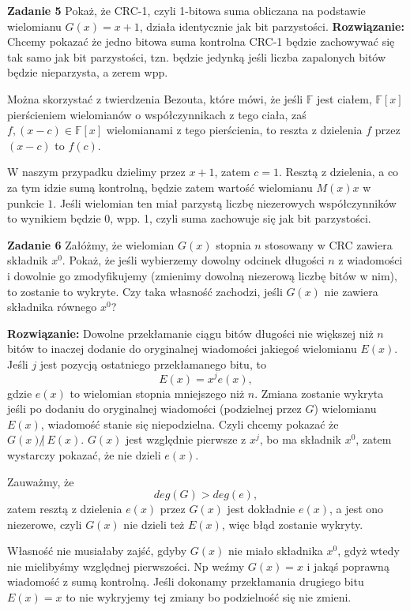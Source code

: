 \documentclass[12pt,a4paper]{article}
\begin{document}
\vskip10pt

\noindent
\textbf{Zadanie 5} Pokaż, że CRC-1, czyli 1-bitowa suma obliczana na podstawie wielomianu \(G(x) = x + 1\), działa identycznie jak bit parzystości.
\vskip5pt
\noindent
\textbf{Rozwiązanie:} Chcemy pokazać że jedno bitowa suma kontrolna CRC-1 będzie zachowywać się tak samo jak bit parzystości, tzn. będzie jedynką jeśli liczba zapalonych bitów będzie nieparzysta, a zerem wpp.

Można skorzystać z twierdzenia Bezouta, które mówi, że jeśli \(\mathbb{F}\) jest ciałem, \(\mathbb{F}{[x]}\) pierścieniem wielomianów o współczynnikach z tego ciała, zaś \(f,(x-c) \in \mathbb{F}[x]\) wielomianami z tego pierścienia, to reszta z dzielenia \(f\) przez \((x-c)\) to \(f(c)\).

W naszym przypadku dzielimy przez \(x+1\), zatem \(c = 1\). Resztą z dzielenia, a co za tym idzie sumą kontrolną, będzie zatem wartość wielomianu \(M(x)x\) w punkcie \(1\). Jeśli wielomian ten miał parzystą liczbę niezerowych współczynników to wynikiem będzie 0, wpp. 1, czyli suma zachowuje się jak bit parzystości.

\vskip10pt
\noindent
\textbf{Zadanie 6} Załóżmy, że wielomian \(G(x)\) stopnia \(n\) stosowany w CRC zawiera składnik \(x^0\). Pokaż, że jeśli wybierzemy dowolny odcinek długości \(n\) z wiadomości i dowolnie go zmodyfikujemy (zmienimy dowolną niezerową liczbę bitów w nim), to zostanie to wykryte. Czy taka własność zachodzi, jeśli \(G(x)\) nie zawiera składnika równego \(x^0\)?

\vskip5pt
\noindent
\textbf{Rozwiązanie:} Dowolne przekłamanie ciągu bitów długości nie większej niż \(n\) bitów to inaczej dodanie do oryginalnej wiadomości jakiegoś wielomianu \(E(x)\). Jeśli \(j\) jest pozycją ostatniego przekłamanego bitu, to
\[
	E(x) = x^je(x),
\]
gdzie \(e(x)\) to wielomian stopnia mniejszego niż \(n\). Zmiana zostanie wykryta jeśli po dodaniu do oryginalnej wiadomości (podzielnej przez \(G\)) wielomianu \(E(x)\), wiadomość stanie się niepodzielna. Czyli chcemy pokazać że \(G(x) \not|~ E(x)\). \(G(x)\) jest względnie pierwsze z \(x^j\), bo ma składnik \(x^0\), zatem wystarczy pokazać, że nie dzieli \(e(x)\).

Zauważmy, że 
\[
	deg(G) > deg(e),
\]
zatem resztą z dzielenia \(e(x)\) przez \(G(x)\) jest dokładnie \(e(x)\), a jest ono niezerowe, czyli \(G(x)\) nie dzieli też \(E(x)\), więc błąd zostanie wykryty. 

Własność nie musiałaby zajść, gdyby \(G(x)\) nie miało składnika \(x^0\), gdyż wtedy nie mielibyśmy względnej pierwszości. Np weźmy \(G(x) = x\) i jakąś poprawną wiadomość z sumą kontrolną. Jeśli dokonamy przekłamania drugiego bitu \(E(x) = x\) to nie wykryjemy tej zmiany bo podzielność się nie zmieni. 
\end{document}
